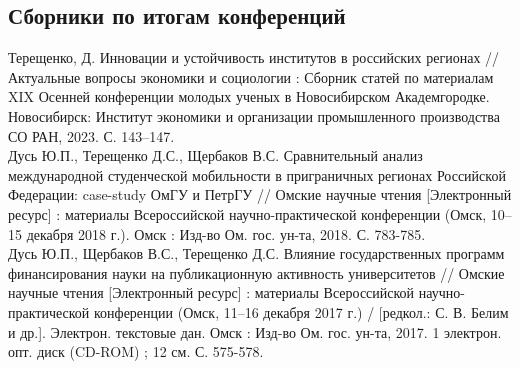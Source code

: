 \documentclass[10pt]{article}
\newcommand{\years}[1]{\marginnote{\scriptsize #1}}
\begin{document}
\subsection*{Сборники по итогам конференций}
\noindent
\years{2023}Терещенко, Д. Инновации и устойчивость институтов в российских регионах // Актуальные вопросы экономики и социологии : Сборник статей по материалам XIX Осенней конференции молодых ученых в Новосибирском Академгородке. Новосибирск: Институт экономики и организации промышленного производства СО РАН, 2023. С. 143–147.\\
\years{2018}Дусь Ю.П., Терещенко Д.С., Щербаков В.С. Сравнительный анализ международной студенческой мобильности в приграничных регионах Российской Федерации: case-study ОмГУ и ПетрГУ // Омские научные чтения [Электронный ресурс] : материалы Всероссийской научно-практической конференции (Омск, 10–15 декабря 2018 г.). Омск : Изд-во Ом. гос. ун-та, 2018. С. 783-785.\\
\years{2017}Дусь Ю.П., Щербаков В.С., Терещенко Д.С. Влияние государственных программ финансирования науки на публикационную активность университетов // Омские научные чтения [Электронный ресурс] : материалы Всероссийской научно-практической конференции (Омск, 11–16 декабря 2017 г.) / [редкол.: С. В. Белим и др.]. Электрон. текстовые дан. Омск : Изд-во Ом. гос. ун-та, 2017. 1 электрон. опт. диск (CD-ROM) ; 12 см. С. 575-578.\\
\end{document}
